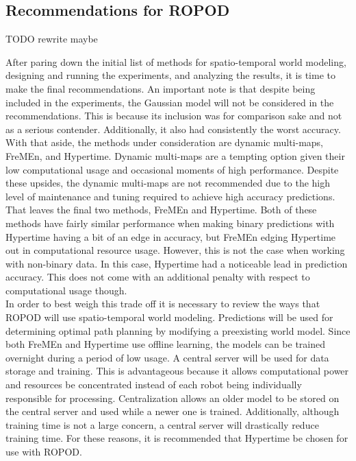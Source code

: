     \subsection{ Recommendations for ROPOD }

    TODO rewrite maybe

    After paring down the initial list of methods for spatio-temporal
    world modeling, designing and running the experiments, and analyzing the
    results, it is time to make the final recommendations. An important note
    is that despite being included in the experiments, the Gaussian model will
    not be considered in the recommendations. This is because its inclusion was
    for comparison sake and not as a serious contender. Additionally, it
    also had consistently the worst accuracy. With that aside, the methods
    under consideration are dynamic multi-maps, FreMEn, and Hypertime.
    Dynamic multi-maps are a tempting option given their low computational
    usage and occasional moments of high performance. Despite these upsides,
    the dynamic multi-maps are not recommended due to the high level of maintenance
    and tuning required to achieve high accuracy predictions. That leaves the
    final two methods, FreMEn and Hypertime. Both of these methods have fairly
    similar performance when making binary predictions with Hypertime having a
    bit of an edge in accuracy, but FreMEn edging Hypertime out in computational
    resource usage. However, this is not the case when working with non-binary
    data. In this case, Hypertime had a noticeable lead in prediction accuracy.
    This does not come with an additional penalty with respect to computational
    usage though. \\

    In order to best weigh this trade off it is necessary to review the ways
    that ROPOD will use spatio-temporal world modeling. Predictions will
    be used for determining optimal path planning by modifying a preexisting
    world model. Since both FreMEn and Hypertime use offline learning, the models
    can be trained overnight during a period of low usage. A central server
    will be used for data storage and training. This is advantageous because
    it allows computational power and resources be concentrated instead of each
    robot being individually responsible for processing. Centralization
    allows an older model to be stored on the central server and used
    while a newer one is trained. Additionally, although training time is not a large concern, a central server
    will drastically reduce training time. For
    these reasons, it is recommended that Hypertime be chosen for use with
    ROPOD. \\

